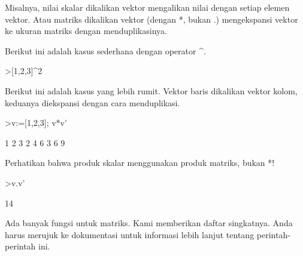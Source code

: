 \documentclass[a4paper,10pt]{article}
\begin{document}
\begin{eulernotebook}
\begin{eulercomment}
\begin{eulercomment}
\begin{eulercomment}
\begin{eulercomment}
\begin{eulercomment}
\begin{eulercomment}
\begin{eulercomment}
Misalnya, nilai skalar dikalikan vektor mengalikan nilai dengan setiap
elemen vektor. Atau matriks dikalikan vektor (dengan *, bukan .)
mengekspansi vektor ke ukuran matriks dengan menduplikasinya.

Berikut ini adalah kasus sederhana dengan operator \textasciicircum{}.
\end{eulercomment}
\begin{eulerprompt}
>[1,2,3]^2
\end{eulerprompt}
\begin{euleroutput}
  [1,  4,  9]
\end{euleroutput}
\begin{eulercomment}
Berikut ini adalah kasus yang lebih rumit. Vektor baris dikalikan
vektor kolom, keduanya diekspansi dengan cara menduplikasi.
\end{eulercomment}
\begin{eulerprompt}
>v:=[1,2,3]; v*v'
\end{eulerprompt}
\begin{euleroutput}
              1             2             3 
              2             4             6 
              3             6             9 
\end{euleroutput}
\begin{eulercomment}
Perhatikan bahwa produk skalar menggunakan produk matriks, bukan *!
\end{eulercomment}
\begin{eulerprompt}
>v.v'
\end{eulerprompt}
\begin{euleroutput}
  14
\end{euleroutput}
\begin{eulercomment}
Ada banyak fungsi untuk matriks. Kami memberikan daftar singkatnya.
Anda harus merujuk ke dokumentasi untuk informasi lebih lanjut tentang
perintah-perintah ini.


\end{eulercomment}
\end{eulercomment}
\end{eulercomment}
\end{eulercomment}
\end{eulercomment}
\end{eulercomment}
\end{eulercomment}
\end{eulernotebook}
\end{document}
